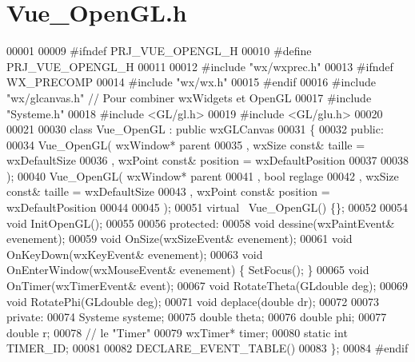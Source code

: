 \section{Vue\+\_\+\+Open\+G\+L.\+h}
\label{_vue___open_g_l_8h_source}

\begin{DoxyCode}
00001 
00009 \textcolor{preprocessor}{#ifndef PRJ\_VUE\_OPENGL\_H}
00010 \textcolor{preprocessor}{#define PRJ\_VUE\_OPENGL\_H}
00011 
00012 \textcolor{preprocessor}{#include "wx/wxprec.h"}
00013 \textcolor{preprocessor}{#ifndef WX\_PRECOMP}
00014 \textcolor{preprocessor}{#include "wx/wx.h"}
00015 \textcolor{preprocessor}{#endif}
00016 \textcolor{preprocessor}{#include "wx/glcanvas.h"} \textcolor{comment}{// Pour combiner wxWidgets et OpenGL}
00017 \textcolor{preprocessor}{#include "Systeme.h"}
00018 \textcolor{preprocessor}{#include <GL/gl.h>}
00019 \textcolor{preprocessor}{#include <GL/glu.h>}
00020 
00021 
00030 \textcolor{keyword}{class }Vue_OpenGL : \textcolor{keyword}{public} wxGLCanvas
00031 \{
00032     \textcolor{keyword}{public}:
00034     Vue_OpenGL( wxWindow*      parent
00035             , wxSize  \textcolor{keyword}{const}& taille   = wxDefaultSize     
00036             , wxPoint \textcolor{keyword}{const}& position = wxDefaultPosition
00037            
00038             );
00040     Vue_OpenGL( wxWindow*      parent
00041             , \textcolor{keywordtype}{bool} reglage
00042             , wxSize  \textcolor{keyword}{const}& taille   = wxDefaultSize     
00043             , wxPoint \textcolor{keyword}{const}& position = wxDefaultPosition
00044            
00045             );
00051     \textcolor{keyword}{virtual} ~Vue_OpenGL() \{\};
00052     
00054     \textcolor{keywordtype}{void} InitOpenGL();
00055 
00056     \textcolor{keyword}{protected}:
00058     \textcolor{keywordtype}{void} dessine(wxPaintEvent& evenement);
00059     \textcolor{keywordtype}{void} OnSize(wxSizeEvent& evenement);
00061     \textcolor{keywordtype}{void} OnKeyDown(wxKeyEvent& evenement);
00063     \textcolor{keywordtype}{void} OnEnterWindow(wxMouseEvent& evenement) \{ SetFocus(); \}
00065     \textcolor{keywordtype}{void} OnTimer(wxTimerEvent& event);
00067     \textcolor{keywordtype}{void} RotateTheta(GLdouble deg);
00069     \textcolor{keywordtype}{void} RotatePhi(GLdouble deg);
00071     \textcolor{keywordtype}{void} deplace(\textcolor{keywordtype}{double} dr);
00072   
00073     \textcolor{keyword}{private}:
00074     Systeme systeme;
00075     \textcolor{keywordtype}{double} theta;
00076     \textcolor{keywordtype}{double} phi;
00077     \textcolor{keywordtype}{double} r;
00078     \textcolor{comment}{// le "Timer"}
00079     wxTimer* timer;
00080     \textcolor{keyword}{static} \textcolor{keywordtype}{int} TIMER\_ID;
00081 
00082 DECLARE\_EVENT\_TABLE()
00083 \};
00084 \textcolor{preprocessor}{#endif }
\end{DoxyCode}
